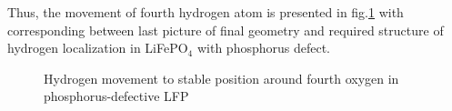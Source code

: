 Thus, the movement of fourth hydrogen atom is presented in fig.\ref{O4Finitialfinal} with corresponding between last picture of final geometry and required structure of hydrogen localization in LiFePO$_{4}$ with phosphorus defect.

\begin{figure}[h]
\begin{minipage}[h]{0.5\linewidth}
\end{minipage}
\hfill
\begin{minipage}[h]{0.5\linewidth}
\end{minipage}
\caption{Hydrogen movement to stable position around fourth oxygen in phosphorus-defective LFP}
\label{O4Finitialfinal}
\end{figure}

